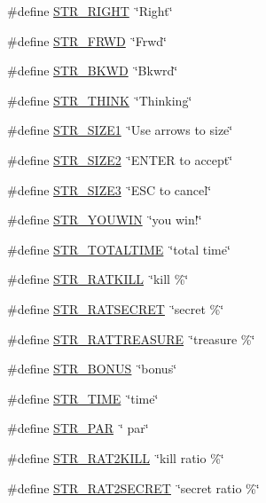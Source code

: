 \begin{DoxyCompactItemize}
\item 
\#define \hyperlink{FOREIGN_8H_a3826c62e951a2cffc5bc9f724554c1d0}{STR\_\-RIGHT}~\char`\"{}Right\char`\"{}
\item 
\#define \hyperlink{FOREIGN_8H_aa2e6892668bfe6baa97a530cec6278e5}{STR\_\-FRWD}~\char`\"{}Frwd\char`\"{}
\item 
\#define \hyperlink{FOREIGN_8H_ab87bc3f1ebf52879d659e8049de19070}{STR\_\-BKWD}~\char`\"{}Bkwrd\char`\"{}
\item 
\#define \hyperlink{FOREIGN_8H_a6636c97db75931c15378fa0b143e2e5a}{STR\_\-THINK}~\char`\"{}Thinking\char`\"{}
\item 
\#define \hyperlink{FOREIGN_8H_ab0a9a48885ea7cb84b28d604bf5f28ec}{STR\_\-SIZE1}~\char`\"{}Use arrows to size\char`\"{}
\item 
\#define \hyperlink{FOREIGN_8H_a57660fc2dc819165c7c3b9678dd527f6}{STR\_\-SIZE2}~\char`\"{}ENTER to accept\char`\"{}
\item 
\#define \hyperlink{FOREIGN_8H_a86506394aab90889faeb2c8f08f80039}{STR\_\-SIZE3}~\char`\"{}ESC to cancel\char`\"{}
\item 
\#define \hyperlink{FOREIGN_8H_a5a045e3cd0901ce36877a113a5dc9c4d}{STR\_\-YOUWIN}~\char`\"{}you win!\char`\"{}
\item 
\#define \hyperlink{FOREIGN_8H_a8db8556dc5e2d2a9ec7c584aa08b75ac}{STR\_\-TOTALTIME}~\char`\"{}total time\char`\"{}
\item 
\#define \hyperlink{FOREIGN_8H_aa8b68eb407b2fd48b234f989d8e435ee}{STR\_\-RATKILL}~\char`\"{}kill    \%\char`\"{}
\item 
\#define \hyperlink{FOREIGN_8H_a0ba1c4378f7364c95f40100bd3c0934e}{STR\_\-RATSECRET}~\char`\"{}secret    \%\char`\"{}
\item 
\#define \hyperlink{FOREIGN_8H_ad4aa07d4583f6a7ccf1871095e7b5cd4}{STR\_\-RATTREASURE}~\char`\"{}treasure    \%\char`\"{}
\item 
\#define \hyperlink{FOREIGN_8H_a1f7fdbccdd4ef2af1edc8653c9150c66}{STR\_\-BONUS}~\char`\"{}bonus\char`\"{}
\item 
\#define \hyperlink{FOREIGN_8H_a1bda77ddc5ccdd6d7b2ad5dd24dc6783}{STR\_\-TIME}~\char`\"{}time\char`\"{}
\item 
\#define \hyperlink{FOREIGN_8H_a7747ee6c3e3a300c85983cdb8861cf98}{STR\_\-PAR}~\char`\"{} par\char`\"{}
\item 
\#define \hyperlink{FOREIGN_8H_aa1bc8012c4713512e14ad90687d0403b}{STR\_\-RAT2KILL}~\char`\"{}kill ratio    \%\char`\"{}
\item 
\#define \hyperlink{FOREIGN_8H_af4d415506bff12e2c557cee0ae82073e}{STR\_\-RAT2SECRET}~\char`\"{}secret ratio    \%\char`\"{}

\end{DoxyCompactItemize}
